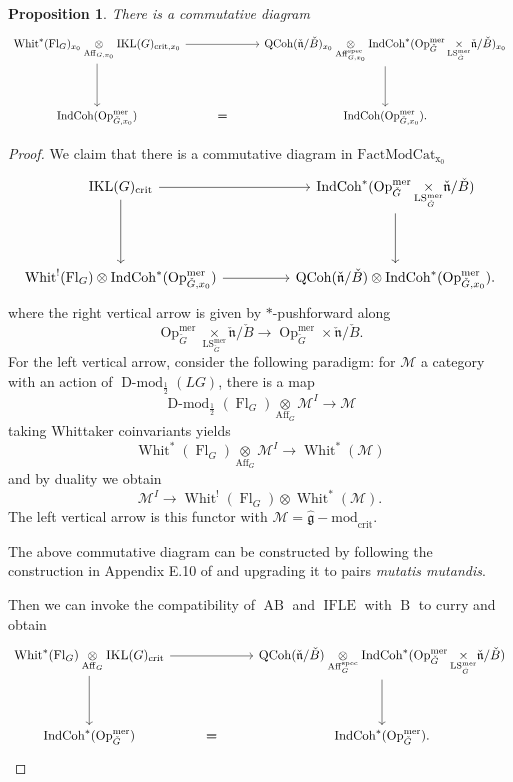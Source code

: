 \documentclass[10pt]{amsart}
\newtheorem{prop}[subsubsection]{Proposition}
\theoremstyle{remark}
\newcommand{\on}[1]{\operatorname{#1}}
\newcommand{\Dmodh}{\on{D-mod}_{\frac{1}{2}}}
\newcommand{\QCoh}{\on{QCoh}}
\newcommand{\IndCoh}{\on{IndCoh}}
\newcommand{\gmod}{\on{\hat{\mathfrak{g}}-mod}}
\newcommand{\IKL}{\on{IKL}(G)_{\on{crit}}}
\newcommand{\IKLx}{\on{IKL}(G)_{\on{crit}, x_0}}
\newcommand{\Gcheck}{\check{G}}
\newcommand{\ncheck}{\check{\mathfrak{n}}}
\newcommand{\Bcheck}{\check{B}}
\newcommand{\FactModCat}{\on{FactModCat_{x_0}}}
\begin{document}
\begin{prop}
    There is a commutative diagram
$$
\begin{tikzcd}
	{\on{Whit}^*(\on{Fl}_G)_{x_0} \underset{\on{Aff}_{G, x_0}}{\otimes} \IKLx} && {\QCoh(\ncheck/\Bcheck)_{x_0} \underset{\on{Aff}_{G, x_0}^{\on{spec}}}{\otimes} \IndCoh^*(\on{Op}_{\Gcheck}^{\on{mer}} \underset{\on{LS}_{\Gcheck}^{\on{mer}}}{\times} \ncheck/\Bcheck)_{x_0}} \\
	\\
	{\IndCoh(\on{Op}_{\Gcheck, x_0}^{\on{mer}})} & {\boldsymbol{=}} & {\IndCoh(\on{Op}_{\Gcheck, x_0}^{\on{mer}}).}
	\arrow[from=1-1, to=1-3]
	\arrow[from=1-1, to=3-1]
	\arrow[from=1-3, to=3-3]
\end{tikzcd}
$$
\end{prop}
\begin{proof}
    We claim that there is a commutative diagram in $\FactModCat$
$$
    \begin{tikzcd}
	{\IKL} && {\IndCoh^*(\on{Op}_{\Gcheck}^{\on{mer}} \underset{\on{LS}_{\Gcheck}^{\on{mer}}}{\times} \ncheck/\Bcheck)} \\
	\\
	{\on{Whit}^!(\on{Fl}_G) \otimes \IndCoh^*(\on{Op}_{\Gcheck, x_0}^{\on{mer}})} && {\QCoh(\ncheck/\Bcheck) \otimes \IndCoh^*(\on{Op}_{\Gcheck, x_0}^{\on{mer}}).}
	\arrow[from=1-1, to=1-3]
	\arrow[from=1-1, to=3-1]
	\arrow[from=1-3, to=3-3]
    \arrow[from=3-1, to=3-3]
\end{tikzcd}
$$
where the right vertical arrow is given by $*$-pushforward along
$$
\on{Op}_{\Gcheck}^{\on{mer}} \underset{\on{LS}_{\Gcheck}^{\on{mer}}}{\times} \ncheck/\Bcheck \longrightarrow \on{Op}_{\Gcheck}^{\on{mer}} \times \ncheck/\Bcheck.
$$
For the left vertical arrow, consider the following paradigm: for $\mathcal{M}$ a category with an action of $\Dmodh(LG)$, there is a map
$$
    \Dmodh(\on{Fl}_G) \underset{\on{Aff}_G}{\otimes} \mathcal{M}^I \to \mathcal{M}
$$
taking Whittaker coinvariants yields
$$
\on{Whit}^*(\on{Fl}_G) \underset{\on{Aff}_G}{\otimes} \mathcal{M}^I \to \on{Whit}^*(\mathcal{M})
$$
and by duality we obtain
$$
\mathcal{M}^I \to \on{Whit}^!(\on{Fl}_G) \otimes \on{Whit}^*(\mathcal{M}).
$$
The left vertical arrow is this functor with $\mathcal{M} = \gmod_{\on{crit}}$.

The above commutative diagram can be constructed by following the construction in Appendix E.10 of \cite{GLC2} and upgrading it to pairs \emph{mutatis mutandis}.

Then we can invoke the compatibility of $\on{AB}$ and $\on{IFLE}$ with $\on{B}$ to curry and obtain
$$
\begin{tikzcd}
	{\on{Whit}^*(\on{Fl}_G) \underset{\on{Aff}_{G}}{\otimes} \IKL} && {\QCoh(\ncheck/\Bcheck) \underset{\on{Aff}_{G}^{\on{spec}}}{\otimes} \IndCoh^*(\on{Op}_{\Gcheck}^{\on{mer}} \underset{\on{LS}_{\Gcheck}^{\on{mer}}}{\times} \ncheck/\Bcheck)} \\
	\\
	{\IndCoh^*(\on{Op}_{\Gcheck}^{\on{mer}})} & {\boldsymbol{=}} & {\IndCoh^*(\on{Op}_{\Gcheck}^{\on{mer}}).}
	\arrow[from=1-1, to=1-3]
	\arrow[from=1-1, to=3-1]
	\arrow[from=1-3, to=3-3]
\end{tikzcd}
$$


\end{proof}
\end{document}
